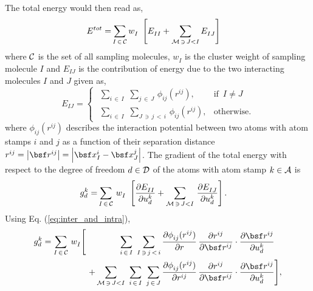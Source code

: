 \documentclass[a4paper,10pt]{article}
\newcommand{\refeq}[1]{Eq. (\ref{eq:#1})}
\newcommand{\norm}[1]{\left\lvert #1 \right\rvert}
\def\mcl  #1{               {\cal #1}}
\begin{document}
The total energy would then read as,
\begin{align}
 E^{tot} = &\sum_{I \, \in \, \mcl C} w^{}_I \,\,
            \left[
		  E^{}_{II} +
		  \sum_{\mcl M \, \ni \, J < I} 
                  E^{}_{IJ} 
            \right]
\end{align}
where $\mcl C$ is the set of all sampling molecules, $w^{}_I$ is the cluster 
weight of sampling molecule $I$ and $E^{}_{IJ}$ is the contribution of energy 
due to the two interacting molecules $I$ and $J$ given as,
\begin{equation}
 E^{}_{IJ} =  \begin{cases}                   \,\,
               \sum\limits_{i \, \in \, I}    \,\,
               \sum\limits_{j \, \in \, J}    \,
		\phi^{}_{ij}(r^{ij}),
		& \text{if } \,  I \neq J \\[1em] \,\,

               \sum\limits_{i \, \in \, I}    \,\,
               \sum\limits_{J \, \ni \, j \, < \, i} \,
               \phi^{}_{ij}(r^{ij}), 
               & \text{otherwise}.
              \end{cases}
\label{eq:inter_and_intra}
\end{equation}
where $\phi^{}_{ij}(r^{ij})$ describes the interaction potential between two 
atoms with atom stamps $i$ and $j$ as a function of their separation distance 
$r^{ij} = \norm{\bsf r^{ij}} = \norm{ \bsf x^{i}_{I} - \bsf x^{j}_{J} }$. 
The gradient of the total energy with respect to the degree of freedom $d \in 
\mcl D$ of the atoms with atom stamp $k \in \mcl A$ is
\begin{align}
 g^k_d = &\sum_{I \, \in \, \mcl C}  \, w^{}_I \,\, 
	  \left[
		\frac{\partial E^{}_{II}}{\partial u^k_d}
		+
		\sum_{\mcl M \, \ni \, J < I}  \,
		\frac{\partial E^{}_{IJ}}{\partial u^k_d}
	   \right].
\end{align}
Using \refeq{inter_and_intra},
\begin{align}
 g^k_d = \sum_{I \, \in \, \mcl C}  \, w^{}_I
          \Bigg[
            \,\,\,\,\,\,\,\,\,\,\,\,\,\,\,\,\,\,\,\,\,\,\,
	    \sum_{i \, \in \, I}                          \,\,
	    \sum_{I \, \ni \, j \, < \, i}                \,
             &\frac{\partial \phi^{}_{ij}(r^{ij})}{\partial r} \, 
               \frac{\partial r^{ij}}{\partial \bsf r^{ij}} \cdot
               \frac{\partial \bsf r^{ij}}{\partial u^k_d}     \\
	    +
	    \sum_{\mcl M \, \ni \, J < I}  \,\,
            \sum_{i \, \in \, I}           \,\,
	    \sum_{j \, \in \, J}           \,
               &\frac{\partial \phi^{}_{ij}(r^{ij})}{\partial r^{ij}} \, 
                 \frac{\partial r^{ij}}{\partial \bsf r^{ij}} \cdot
                 \frac{\partial \bsf r^{ij}}{\partial u^k_d}
           \Bigg],
\end{align}
\end{document}
